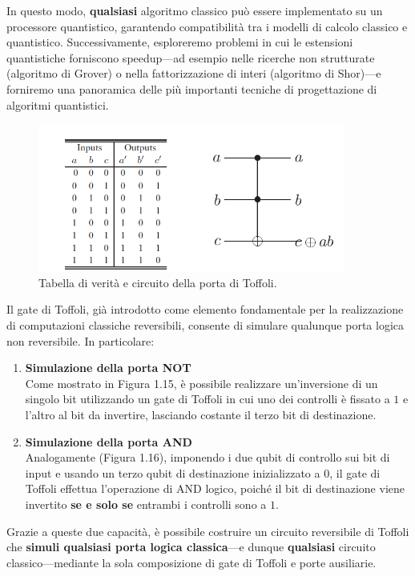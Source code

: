 \documentclass[a4paper,12pt]{report}
\theoremstyle{plain}
\begin{document}
In questo modo, \textbf{qualsiasi} algoritmo classico può essere implementato su un processore quantistico, garantendo compatibilità tra i modelli di calcolo classico e quantistico. Successivamente, esploreremo problemi in cui le estensioni quantistiche forniscono speedup—ad esempio nelle ricerche non strutturate (algoritmo di Grover) o nella fattorizzazione di interi (algoritmo di Shor)—e forniremo una panoramica delle più importanti tecniche di progettazione di algoritmi quantistici.
\begin{figure}[H]
    \centering
    \includegraphics[width=0.9\textwidth]{Immagine13.png} 
    \caption{Tabella di verità e circuito della porta di Toffoli.}
    \label{Immagine13}
\end{figure}
\noindent Il gate di Toffoli, già introdotto come elemento fondamentale per la realizzazione di computazioni classiche reversibili, consente di simulare qualunque porta logica non reversibile. In particolare:
\begin{enumerate}
    \item \textbf{Simulazione della porta NOT} \\
    Come mostrato in Figura 1.15, è possibile realizzare un'inversione di un singolo bit utilizzando un gate di Toffoli in cui uno dei controlli è fissato a $1$ e l'altro al bit da invertire, lasciando costante il terzo bit di destinazione.

    \item \textbf{Simulazione della porta AND} \\
    Analogamente (Figura 1.16), imponendo i due qubit di controllo sui bit di input e usando un terzo qubit di destinazione inizializzato a $0$, il gate di Toffoli effettua l'operazione di AND logico, poiché il bit di destinazione viene invertito \textbf{se e solo se} entrambi i controlli sono a $1$.
\end{enumerate}
Grazie a queste due capacità, è possibile costruire un circuito reversibile di Toffoli che \textbf{simuli qualsiasi porta logica classica}—e dunque \textbf{qualsiasi} circuito classico—mediante la sola composizione di gate di Toffoli e porte ausiliarie.
\end{document}
